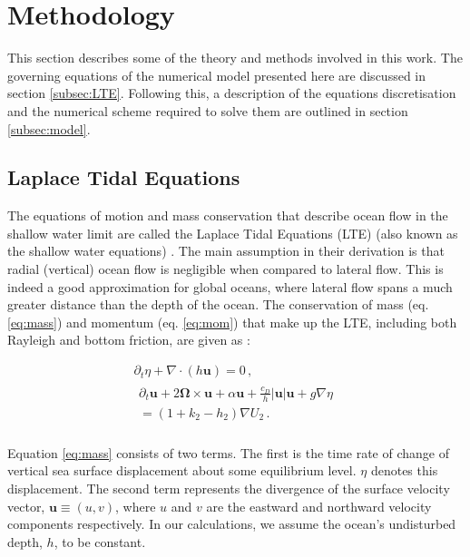\section{Methodology}

This section describes some of the theory and methods involved in this work. The governing equations of the numerical model presented here are discussed in section \ref{subsec:LTE}. Following this, a description of the equations discretisation and the numerical scheme required to solve them are outlined in section \ref{subsec:model}.

\subsection{Laplace Tidal Equations \label{subsec:LTE}}

The equations of motion and mass conservation that describe ocean flow in the shallow water limit are called the Laplace Tidal Equations (LTE) (also known as the shallow water equations) \citep{lamb1932hydrodynamics}. The main assumption in their derivation is that radial (vertical) ocean flow is negligible when compared to lateral flow. This is indeed a good approximation for global oceans, where lateral flow spans a much greater distance than the depth of the ocean. The conservation of mass (eq. \ref{eq:mass}) and momentum (eq. \ref{eq:mom}) that make up the LTE, including both Rayleigh and bottom friction, are given as \citep{sears1995tidal,tyler2008strong,matsuyama2014tidal}:


\vspace{-0.5cm}
\begin{gather}
\partial_t \eta + \nabla \cdot \left(h \bm{u}\right) = 0\, , \label{eq:mass}\\
\begin{aligned} 
\partial_t \bm{u} + 2 \bm{\Omega} \times \bm{u} + \alpha\bm{u} + \frac{c_D}{h} \left|\bm{u}\right| \bm{u}  + g \nabla \eta \\ = (1 + k_2 - h_2) \nabla U_2 \, . \label{eq:mom}\\
\end{aligned} 
\end{gather}

Equation \ref{eq:mass} consists of two terms. The first is the time rate of change of vertical sea surface displacement about some equilibrium level. $\eta$ denotes this displacement. The second term represents the divergence of the surface velocity vector, $\bm{u} \equiv (u, v)$, where $u$ and $v$ are the eastward and northward velocity components respectively. In our calculations, we assume the ocean's undisturbed depth, $h$, to be constant. 

